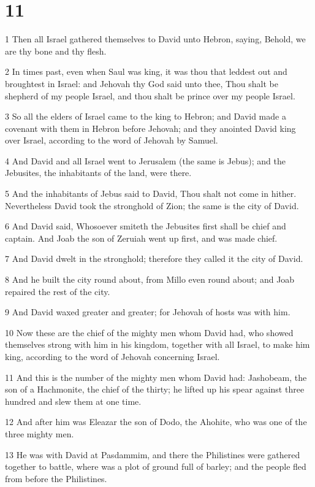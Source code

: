 \chapter{11}

\par 1 Then all Israel gathered themselves to David unto Hebron, saying, Behold, we are thy bone and thy flesh.
\par 2 In times past, even when Saul was king, it was thou that leddest out and broughtest in Israel: and Jehovah thy God said unto thee, Thou shalt be shepherd of my people Israel, and thou shalt be prince over my people Israel.
\par 3 So all the elders of Israel came to the king to Hebron; and David made a covenant with them in Hebron before Jehovah; and they anointed David king over Israel, according to the word of Jehovah by Samuel.
\par 4 And David and all Israel went to Jerusalem (the same is Jebus); and the Jebusites, the inhabitants of the land, were there.
\par 5 And the inhabitants of Jebus said to David, Thou shalt not come in hither. Nevertheless David took the stronghold of Zion; the same is the city of David.
\par 6 And David said, Whosoever smiteth the Jebusites first shall be chief and captain. And Joab the son of Zeruiah went up first, and was made chief.
\par 7 And David dwelt in the stronghold; therefore they called it the city of David.
\par 8 And he built the city round about, from Millo even round about; and Joab repaired the rest of the city.
\par 9 And David waxed greater and greater; for Jehovah of hosts was with him.
\par 10 Now these are the chief of the mighty men whom David had, who showed themselves strong with him in his kingdom, together with all Israel, to make him king, according to the word of Jehovah concerning Israel.
\par 11 And this is the number of the mighty men whom David had: Jashobeam, the son of a Hachmonite, the chief of the thirty; he lifted up his spear against three hundred and slew them at one time.
\par 12 And after him was Eleazar the son of Dodo, the Ahohite, who was one of the three mighty men.
\par 13 He was with David at Pasdammim, and there the Philistines were gathered together to battle, where was a plot of ground full of barley; and the people fled from before the Philistines.
